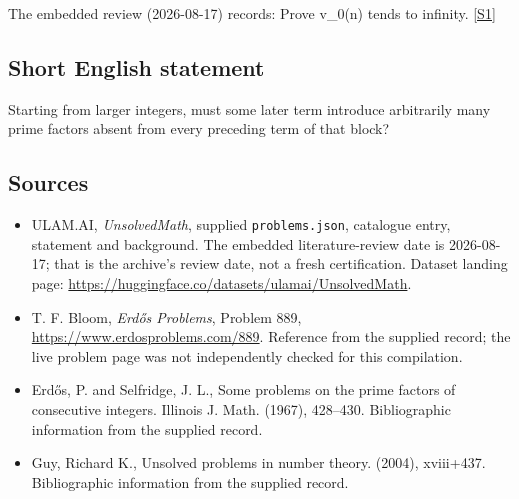 \documentclass[11pt,a4paper]{article}
\newcommand{\sref}[2]{\hyperlink{source:#1:#2}{[S#2]}}
\begin{document}
The embedded review (2026-08-17) records: Prove v\_0(n) tends to infinity. \sref{statement}{1}

\subsection{Short English statement}

Starting from larger integers, must some later term introduce arbitrarily many prime factors absent from every preceding term of that block?

\subsection{Sources}

{\small

\begin{itemize}

\item[\hypertarget{source:statement:1}{S1}] ULAM.AI, \emph{UnsolvedMath}, supplied \texttt{problems.json}, catalogue entry, statement and background. The embedded literature-review date is 2026-08-17; that is the archive’s review date, not a fresh certification. Dataset landing page: \url{https://huggingface.co/datasets/ulamai/UnsolvedMath}.

\item[\hypertarget{source:statement:2}{S2}] T. F. Bloom, \emph{Erdős Problems}, Problem 889, \url{https://www.erdosproblems.com/889}. Reference from the supplied record; the live problem page was not independently checked for this compilation.

\item[\hypertarget{source:statement:3}{S3}] Erd\H{o}s, P. and Selfridge, J. L., Some problems on the prime factors of consecutive integers. Illinois J. Math. (1967), 428--430. Bibliographic information from the supplied record.

\item[\hypertarget{source:statement:4}{S4}] Guy, Richard K., Unsolved problems in number theory. (2004), xviii+437. Bibliographic information from the supplied record.

\end{itemize}

}

\label{end:statement}
\end{document}

